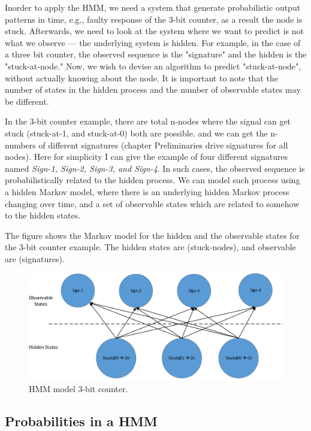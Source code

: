 Inorder to apply the HMM, we need a system that generate probabilistic output patterns in time, e.g., faulty response of the 3-bit counter, as a result the node is stuck. Afterwards, we need to look at the system where we want to predict is not what we observe ---  the underlying system is hidden. For example, in the case of a three bit counter, the observed sequence is the "signature" and the hidden is the "stuck-at-node." Now, we wish to devise an algorithm to predict "stuck-at-node", without actually knowing about the node. It is important to note that the number of states in the hidden process and the number of observable states may be different. 


In the 3-bit counter example, there are total n-nodes where the signal can get stuck (stuck-at-1, and stuck-at-0) both are possible. and we can get the n- numbers of different signatures (chapter Preliminaries drive signatures for all nodes). Here for simplicity I can give the example of four different signatures named \textit{Sign-1, Sign-2, Sign-3, and Sign-4}. In such cases, the observed sequence is probabilistically related to the hidden process. We can model such process using a hidden Markov model, where there is an underlying hidden Markov process changing over time, and a set of observable states which are related to somehow to the hidden states.


The figure shows the Markov model for the hidden and the observable states for the 3-bit counter example. The hidden states are (stuck-nodes), and observable are (signatures). 


\begin{figure}[tb!]

 \centering
  \captionsetup{justification=centering}    
   \includegraphics[scale=0.8]{Figures/HMM.pdf}
   \caption{HMM model 3-bit counter.}
\label{fig:ychart}
\end{figure}

\subsection{Probabilities in a HMM}

